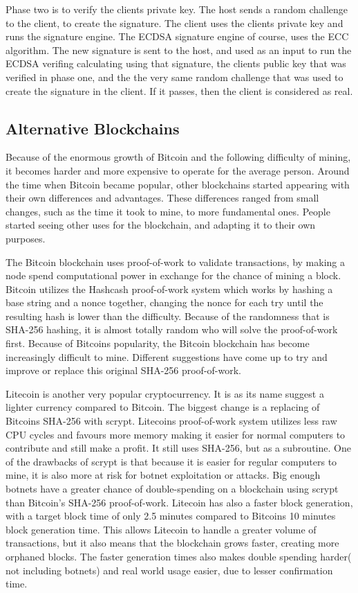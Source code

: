\documentclass[12pt]{article}
\begin{document}
Phase two is to verify the clients private key. The host sends a random challenge to the client, to create the signature. The client uses the clients private key and runs the signature engine. The ECDSA signature engine of course, uses the ECC algorithm. The new signature is sent to the host, and used as an input to run the ECDSA verifing calculating using that signature, the clients public key that was verified in phase one, and the the very same random challenge that was used to create the signature in the client. If it passes, then the client is considered as real. 

\subsection{Alternative Blockchains}\label{subsec:difblocks}
Because of the enormous growth of Bitcoin and the following difficulty of mining, it becomes harder and more expensive to operate for the average person. Around the time when Bitcoin became popular, other blockchains started appearing with their own differences and advantages. These differences ranged from small changes, such as the time it took to mine, to more fundamental ones. People started seeing other uses for the blockchain, and adapting it to their own purposes. 

The Bitcoin blockchain uses proof-of-work to validate transactions, by making a node spend computational power in exchange for the chance of mining a block. Bitcoin utilizes the Hashcash\cite{hashcash} proof-of-work system which works by hashing a base string and a nonce together, changing the nonce for each try until the resulting hash is lower than the difficulty. Because of the randomness that is SHA-256 hashing, it is almost totally random who will solve the proof-of-work first. Because of Bitcoins popularity, the Bitcoin blockchain has become increasingly difficult to mine. Different suggestions have come up to try and improve or replace this original SHA-256 proof-of-work. 

Litecoin is another very popular cryptocurrency. It is as its name suggest a lighter currency compared to Bitcoin. The biggest change is a replacing of Bitcoins SHA-256 with scrypt. Litecoins proof-of-work system utilizes less raw CPU cycles and favours more memory making it easier for normal computers to contribute and still make a profit. It still uses SHA-256, but as a subroutine. One of the drawbacks of scrypt is that because it is easier for regular computers to mine, it is also more at risk for botnet exploitation or attacks. Big enough botnets have a greater chance of double-spending on a blockchain using scrypt than Bitcoin's SHA-256 proof-of-work. Litecoin has also a faster block generation, with a target block time of only 2.5 minutes compared to Bitcoins 10 minutes block generation time. This allows Litecoin to handle a greater volume of transactions, but it also means that the blockchain grows faster, creating more orphaned blocks. The faster generation times also makes double spending harder( not including botnets) and real world usage easier, due to lesser confirmation time. 
\end{document}
